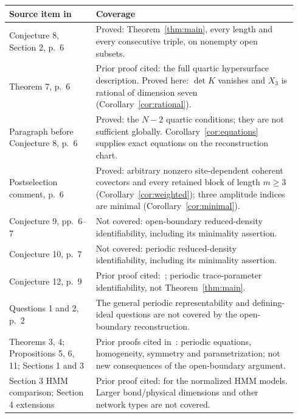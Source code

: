 \documentclass[11pt]{article}
\begin{document}
\begin{longtable}{@{}p{0.29\linewidth}p{0.65\linewidth}@{}}
\toprule
Source item in~\cite{CM} & Coverage\\
\midrule
Conjecture 8, Section 2, p.\ 6 & Proved: Theorem~\ref{thm:main}, every length and every consecutive
triple, on nonempty open subsets.\\
Theorem 7, p.\ 6 & Prior proof cited: the full quartic hypersurface description.
Proved here: $\det K$ vanishes and $X_3$ is rational of dimension seven
(Corollary~\ref{cor:rational}).\\
Paragraph before Conjecture 8, p.\ 6 & Proved: the $N-2$ quartic conditions;
they are not sufficient globally. Corollary~\ref{cor:equations} supplies exact
equations on the reconstruction chart.\\
Postselection comment, p.\ 6 & Proved: arbitrary nonzero site-dependent
coherent covectors and every retained block of length $m\geq3$
(Corollary~\ref{cor:weighted}); three amplitude indices are minimal
(Corollary~\ref{cor:minimal}).\\
Conjecture 9, pp.\ 6--7 & Not covered: open-boundary reduced-density
identifiability, including its minimality assertion.\\
Conjecture 10, p.\ 7 & Not covered: periodic reduced-density identifiability,
including its minimality assertion.\\
Conjecture 12, p.\ 9 & Prior proof cited:~\cite[Theorem 3.30, arXiv version]{CMS};
periodic trace-parameter identifiability, not Theorem~\ref{thm:main}.\\
Questions 1 and 2, p.\ 2 & The general periodic representability and defining-ideal
questions are not covered by the open-boundary reconstruction.\\
Theorems 3, 4; Propositions 5, 6, 11; Sections 1 and 3 & Prior proofs cited
in~\cite{CM}: periodic equations, homogeneity, symmetry and parametrization;
not new consequences of the open-boundary argument.\\
Section 3 HMM comparison; Section 4 extensions & Prior proof cited:
\cite[Theorems 4.1, 5.11]{HMM} for the normalized HMM models.
Larger bond/physical dimensions and other network types are not covered.\\
\bottomrule
\end{longtable}
\end{document}
